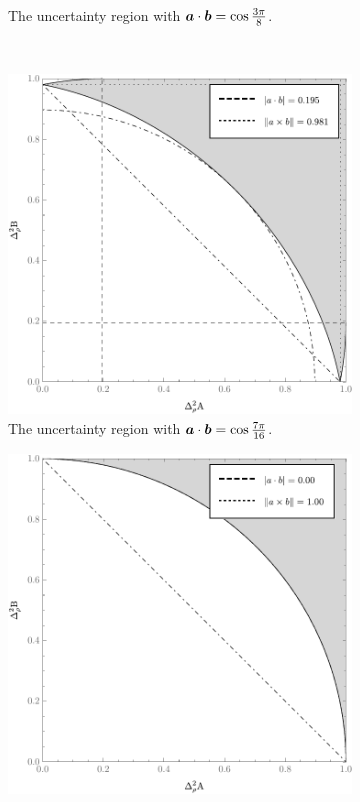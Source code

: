 \begin{figure}[H]
\begin{subfigure}[t]{0.38\textwidth}
    \caption{The uncertainty region with $\bm{a}\cdot\bm{b} = \cos\frac{3\pi}{8}$.}
    \label{fig:err-region-3pi-by-8}
  \end{subfigure}\\
  \begin{subfigure}[t]{0.38\textwidth}\centering
    \includegraphics[width=\textwidth]{figs/new-qubit-error-region-with-upper-and-lower-bounds-7-pi-by-16-bw}
    \caption{The uncertainty region with $\bm{a}\cdot\bm{b} = \cos\frac{7\pi}{16}$.}
    \label{fig:err-region-7pi-by-16}
  \end{subfigure}\hfill
  \begin{subfigure}[t]{0.38\textwidth}\centering
    \includegraphics[width=\textwidth]{figs/new-qubit-error-region-with-upper-and-lower-bounds-pi-by-2-bw}

\end{subfigure}
\end{figure}
